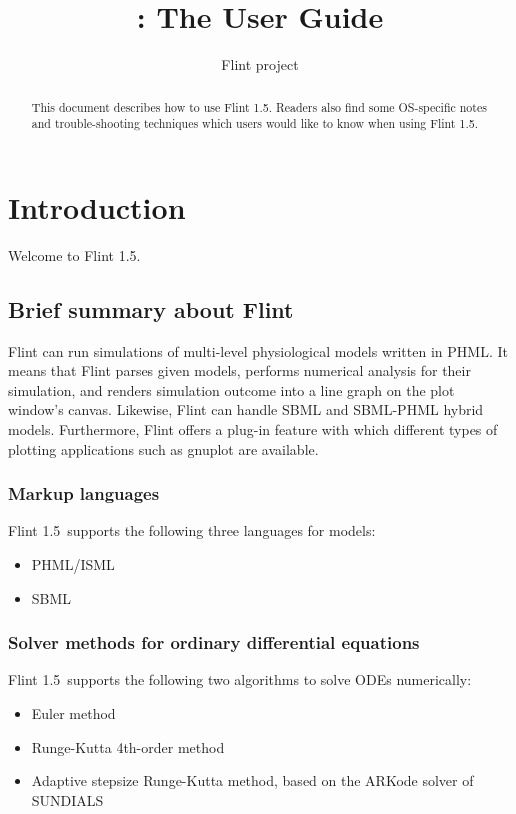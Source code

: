 \documentclass[a4paper,10pt]{report}
\title{\Flint: The User Guide}
\author{Flint project}
\def\FlintVersion{1.5}
\def\Flint{Flint \FlintVersion}
\begin{document}
\maketitle

\begin{abstract}
This document describes how to use \Flint.
Readers also find some OS-specific notes and trouble-shooting techniques which
users would like to know when using \Flint.
\end{abstract}

\tableofcontents



\chapter{Introduction}
Welcome to \Flint.

\section{Brief summary about Flint}
Flint can run simulations of multi-level physiological models written in PHML.
It means that Flint parses given models, performs numerical analysis for their
simulation, and renders simulation outcome into a line graph on the plot
window's canvas. Likewise, Flint can handle SBML and SBML-PHML hybrid models.
Furthermore, Flint offers a plug-in feature with which different types of
plotting applications such as gnuplot are available.

\subsection{Markup languages}
\Flint\ supports the following three languages for models:
\begin{itemize}
\item PHML/ISML
\item SBML
\end{itemize}

\subsection{Solver methods for ordinary differential equations}
\Flint\ supports the following two algorithms to solve ODEs numerically:
\begin{itemize}
\item Euler method
\item Runge-Kutta 4th-order method
\item Adaptive stepsize Runge-Kutta method, based on the ARKode solver of SUNDIALS
\end{itemize}
\end{document}
